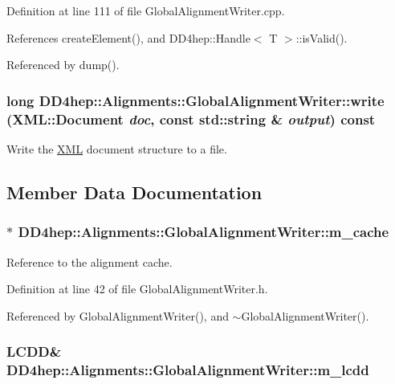 Definition at line 111 of file GlobalAlignmentWriter.cpp.

References createElement(), and DD4hep::Handle$<$ T $>$::isValid().

Referenced by dump().\hypertarget{class_d_d4hep_1_1_alignments_1_1_global_alignment_writer_a77a80a0fe5b34402eccd45e9d1fdd420}{
\subsubsection[{write}]{\setlength{\rightskip}{0pt plus 5cm}long DD4hep::Alignments::GlobalAlignmentWriter::write ({\bf XML::Document} {\em doc}, \/  const std::string \& {\em output}) const}}
\label{class_d_d4hep_1_1_alignments_1_1_global_alignment_writer_a77a80a0fe5b34402eccd45e9d1fdd420}


Write the \hyperlink{namespace_d_d4hep_1_1_x_m_l}{XML} document structure to a file. 

\subsection{Member Data Documentation}
\hypertarget{class_d_d4hep_1_1_alignments_1_1_global_alignment_writer_a467b49352cf36fef9e92b1dfa407edec}{
\subsubsection[{m\_\-cache}]{$\ast$ {\bf DD4hep::Alignments::GlobalAlignmentWriter::m\_\-cache}}}
\label{class_d_d4hep_1_1_alignments_1_1_global_alignment_writer_a467b49352cf36fef9e92b1dfa407edec}


Reference to the alignment cache. 

Definition at line 42 of file GlobalAlignmentWriter.h.

Referenced by GlobalAlignmentWriter(), and $\sim$GlobalAlignmentWriter().\hypertarget{class_d_d4hep_1_1_alignments_1_1_global_alignment_writer_a831748e7145b8b3b95da4e0b87a49f5f}{
\subsubsection[{m\_\-lcdd}]{\setlength{\rightskip}{0pt plus 5cm}LCDD\& {\bf DD4hep::Alignments::GlobalAlignmentWriter::m\_\-lcdd}}}
\label{class_d_d4hep_1_1_alignments_1_1_global_alignment_writer_a831748e7145b8b3b95da4e0b87a49f5f}


